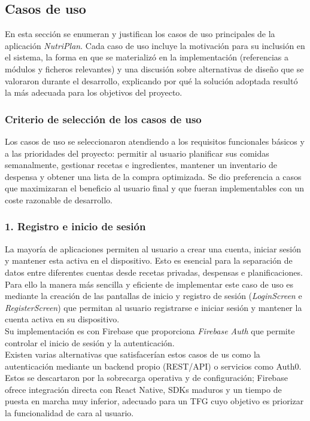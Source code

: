 \documentclass[twoside, openright, 11pt]{report}
\begin{document}
		\subsection{Casos de uso}
		\label{sec:casos_de_uso}
		
		En esta sección se enumeran y justifican los casos de uso principales de la aplicación \textit{NutriPlan}. Cada caso de uso incluye la motivación para su inclusión en el sistema, la forma en que se materializó en la implementación (referencias a módulos y ficheros relevantes) y una discusión sobre alternativas de diseño que se valoraron durante el desarrollo, explicando por qué la solución adoptada resultó la más adecuada para los objetivos del proyecto.
		
		\subsubsection*{Criterio de selección de los casos de uso}
		Los casos de uso se seleccionaron atendiendo a los requisitos funcionales básicos y a las prioridades del proyecto: permitir al usuario planificar sus comidas semanalmente, gestionar recetas e ingredientes, mantener un inventario de despensa y obtener una lista de la compra optimizada. Se dio preferencia a casos que maximizaran el beneficio al usuario final y que fueran implementables con un coste razonable de desarrollo.
		
		\subsubsection{1. Registro e inicio de sesión}
		La mayoría de aplicaciones permiten al usuario a crear una cuenta, iniciar sesión y mantener esta activa en el dispositivo. Esto es esencial para la separación de datos entre diferentes cuentas desde recetas privadas, despensas e planificaciones.\\
		Para ello la manera más sencilla y eficiente de implementar este caso de uso es mediante la creación de las pantallas de inicio y registro de sesión (\textit{LoginScreen} e \textit{RegisterScreen}) que permitan al usuario registrarse e iniciar sesión y mantener la cuenta activa en su dispositivo.\\
		Su implementación es con Firebase que proporciona \textit{Firebase Auth} que permite controlar el inicio de sesión y la autenticación.\\
		Existen varias alternativas que satisfacerían estos casos de us como la autenticación mediante un backend propio (REST/API) o servicios como Auth0. Estos se descartaron por la sobrecarga operativa y de configuración; Firebase ofrece integración directa con React Native, SDKs maduros y un tiempo de puesta en marcha muy inferior, adecuado para un TFG cuyo objetivo es priorizar la funcionalidad de cara al usuario.
		
\end{document}
